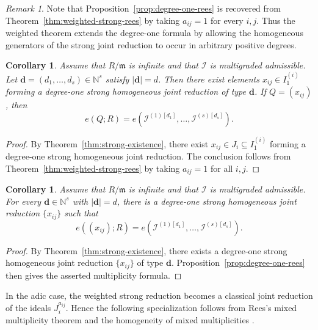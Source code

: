 \documentclass[reqno,12pt]{amsart}
\theoremstyle{plain}
\newtheorem{cor}[prop]{Corollary}
\theoremstyle{definition}
\theoremstyle{remark}
\newtheorem{rem}[prop]{Remark}
\newcommand{\N}{\mathbb N}
\numberwithin{equation}{section}
\begin{document}
\begin{rem}
Note that Proposition~\ref{prop:degree-one-rees} is recovered from
Theorem~\ref{thm:weighted-strong-rees} by taking
$a_{ij}=1$ for every $i,j$. Thus the weighted theorem extends the
degree-one formula by allowing the homogeneous generators of the strong
joint reduction to occur in arbitrary positive degrees.
\end{rem}

\begin{cor}
\label{cor:degree-one-realization}
Assume that $R/\mathfrak m$ is infinite and that
$\boldsymbol{\mathcal I}$ is multigraded admissible. Let
$\mathbf d=(d_1,\ldots,d_s)\in\mathbb N^s$ satisfy
$|\mathbf d|=d$. Then there exist elements
$x_{ij}\in I_1^{(i)}$ forming a degree-one strong homogeneous joint
reduction of type $\mathbf d$. If $Q=(x_{ij})$, then
\[
e(Q;R)
=
e\!\left(
\mathcal I^{(1)[d_1]},\ldots,
\mathcal I^{(s)[d_s]}
\right).
\]
\end{cor}

\begin{proof}
By Theorem~\ref{thm:strong-existence}, there exist
$x_{ij}\in J_i\subseteq I_1^{(i)}$ forming a degree-one strong
homogeneous joint reduction. The conclusion follows from
Theorem~\ref{thm:weighted-strong-rees} by taking $a_{ij}=1$ for all
$i,j$.
\end{proof}



\begin{cor}
\label{cor:strong-realization}
Assume that $R/\mathfrak m$ is infinite and that
$\boldsymbol{\mathcal I}$ is multigraded admissible. For every
$\mathbf d\in\N^s$ with $|\mathbf d|=d$, there is a degree-one strong
homogeneous joint reduction $\{x_{ij}\}$ such that
\[
e((x_{ij});R)
=
e\!\left(\mathcal I^{(1)[d_1]},\ldots,
\mathcal I^{(s)[d_s]}\right).
\]
\end{cor}

\begin{proof}
By Theorem~\ref{thm:strong-existence}, there exists a degree-one strong
homogeneous joint reduction $\{x_{ij}\}$ of type $\mathbf d$.
Proposition~\ref{prop:degree-one-rees} then gives the asserted
multiplicity formula.
\end{proof}

In the adic case, the weighted strong reduction becomes a classical
joint reduction of the ideals $J_i^{a_{ij}}$. Hence the following
specialization follows from Rees's mixed multiplicity theorem
\cite[Theorem~17.4.9]{SwansonHuneke} and the homogeneity of mixed
multiplicities
\cite[Theorem~17.4.2 and Definition~17.4.3]{SwansonHuneke}.
\end{document}

